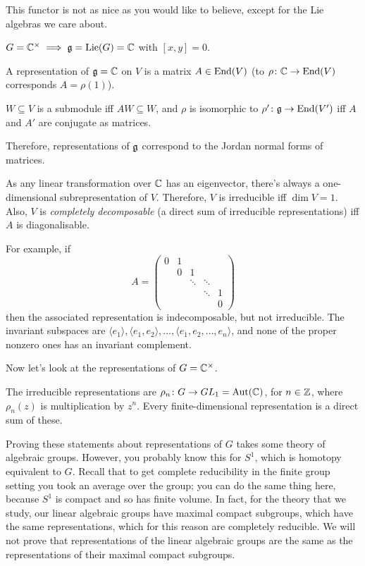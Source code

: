 This functor is not as nice as you would like to believe, except for the Lie
algebras we care about.

\begin{example}
$G = \mathbb{C}^\times \implies \mathfrak{g} = \operatorname{Lie}(G) = \mathbb{C}$ with $[x, y] = 0$.

A representation of $\mathfrak{g} = \mathbb{C}$ on $V$ is a matrix $A \in \operatorname{End}(V)$ (to
$\rho\colon \mathbb{C} \to \operatorname{End}(V)$ corresponds $A = \rho(1)$).

$W \subseteq V$ is a submodule iff $AW \subseteq W$, and $\rho$ is isomorphic
to $\rho'\colon \mathfrak{g} \to \operatorname{End}(V')$ iff $A$ and $A'$ are conjugate as matrices.

Therefore, representations of $\mathfrak{g}$ correspond to the Jordan normal forms of
matrices.

As any linear transformation over $\mathbb{C}$ has an eigenvector, there's always a
one-dimensional subrepresentation of $V$. Therefore, $V$ is irreducible iff
$\dim V = 1$. Also, $V$ is \emph{completely decomposable} (a direct sum of
irreducible representations) iff $A$ is diagonalisable.

For example, if
\[
  A = \begin{pmatrix}
        0 & 1 &        &        &   \\
          & 0 & 1      &        &   \\
          &   & \ddots & \ddots &   \\
          &   &        & \ddots & 1 \\
          &   &        &        & 0
      \end{pmatrix}
\]
then the associated representation is indecomposable, but not irreducible.
The invariant subspaces are $\langle e_1\rangle, \langle e_1, e_2\rangle,
\dots, \langle e_1, e_2, \dots, e_n\rangle$, and none of the proper nonzero
ones has an invariant complement.
\end{example}

Now let's look at the representations of $G = \mathbb{C}^\times$.

The irreducible representations are $\rho_n\colon G \to GL_1 = \operatorname{Aut}(\mathbb{C})$,
for $n \in \mathbb{Z}$, where $\rho_n(z)$ is multiplication by $z^n$. Every
finite-dimensional representation is a direct sum of these.

\begin{remark}
Proving these statements about representations of $G$ takes some theory of
algebraic groups. However, you probably know this for $S^1$, which is homotopy
equivalent to $G$. Recall that to get complete reducibility in the finite group
setting you took an average over the group; you can do the same thing here,
because $S^1$ is compact and so has finite volume. In fact, for the theory
that we study, our linear algebraic groups have maximal compact subgroups,
which have the same representations, which for this reason are completely
reducible. We will not prove that representations of the linear algebraic
groups are the same as the representations of their maximal compact
subgroups.
\end{remark}

